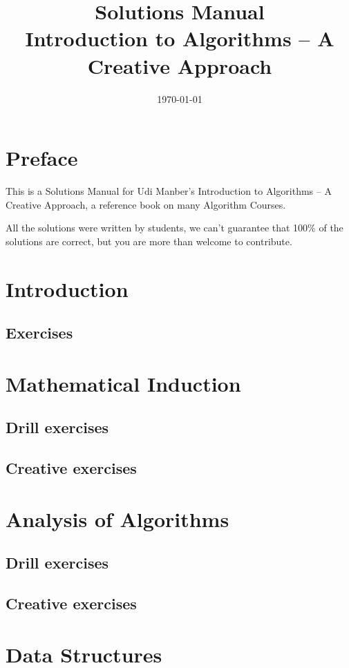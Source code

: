 \documentclass[a4paper,11pt]{memoir}
\title{{\huge \textbf{Solutions Manual}}\\Introduction to Algorithms -- A Creative
Approach}
\author{}
\date{\today}
\begin{document}
    \frontmatter

    \chapter{Preface}
    This is a Solutions Manual for Udi Manber's Introduction to Algorithms -- A
    Creative Approach, a reference book on many Algorithm Courses.

    All the solutions were written by students, we can't guarantee that 100\% of
    the solutions are correct, but you are more than welcome to contribute.

    \newpage
    \tableofcontents

    \mainmatter
    \chapter{Introduction}
    \section*{Exercises}

    \chapter{Mathematical Induction}
    \section*{Drill exercises}
    \section*{Creative exercises}

    \chapter{Analysis of Algorithms}
    \section*{Drill exercises}
    
    \section*{Creative exercises}

    \chapter{Data Structures}
\end{document}
